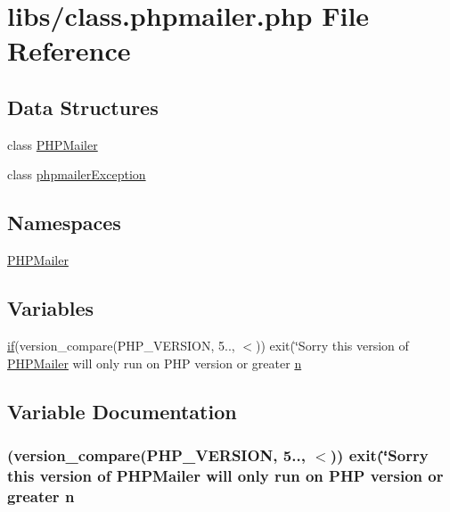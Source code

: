 \hypertarget{class_8phpmailer_8php}{}\section{libs/class.phpmailer.\+php File Reference}
\label{class_8phpmailer_8php}
\subsection*{Data Structures}
\begin{DoxyCompactItemize}
\item 
class \hyperlink{class_p_h_p_mailer}{P\+H\+P\+Mailer}
\item 
class \hyperlink{classphpmailer_exception}{phpmailer\+Exception}
\end{DoxyCompactItemize}
\subsection*{Namespaces}
\begin{DoxyCompactItemize}
\item 
 \hyperlink{namespace_p_h_p_mailer}{P\+H\+P\+Mailer}
\end{DoxyCompactItemize}
\subsection*{Variables}
\begin{DoxyCompactItemize}
\item 
\hyperlink{app_2views_2index_2index_8php_a3d726968fd3dc3d64cac837a26187799}{if}(version\+\_\+compare(P\+H\+P\+\_\+\+V\+E\+R\+S\+I\+O\+N, \textquotesingle{}5..\textquotesingle{}, \textquotesingle{}$<$\textquotesingle{})) exit(\char`\"{}Sorry this version of \hyperlink{class_p_h_p_mailer}{P\+H\+P\+Mailer} will only run on P\+H\+P version or greater \hyperlink{class_8phpmailer_8php_aea57e70878e251b905a43852b76107b0}{n}
\end{DoxyCompactItemize}


\subsection{Variable Documentation}
\hypertarget{class_8phpmailer_8php_aea57e70878e251b905a43852b76107b0}{}
\subsubsection[{n}]{ (version\+\_\+compare(P\+H\+P\+\_\+\+V\+E\+R\+S\+I\+O\+N, \textquotesingle{}5..\textquotesingle{}, \textquotesingle{}$<$\textquotesingle{})) exit(\char`\"{}Sorry this version of {\bf P\+H\+P\+Mailer} will only run on P\+H\+P version or greater n}\label{class_8phpmailer_8php_aea57e70878e251b905a43852b76107b0}
